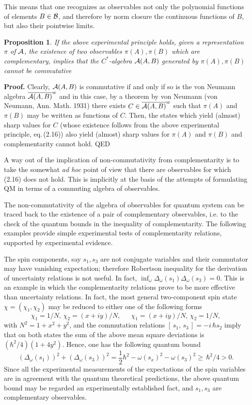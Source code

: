 \documentclass[12pt]{article}
\newtheorem{Proposition}[Theorem]{Proposition}
\def \Pf {{\bf Proof.\,\,}}
\def \ume {{\scriptstyle{\frac{1}{2}}}}
\def \om {{\omega}}
\def \A {{\cal A}}
\def \B {{\cal B}}
\begin{document}
This means that one recognizes as observables not only the polynomial functions of elements $ B \in \B$, and therefore by norm closure the continuous functions of $B$, but also their pointwise limits. 
 \begin{Proposition} If the above experimental principle holds, given a representation $\pi$ of $\A$, the existence of  two  observables $\pi(A), \pi(B)$ which are complementary, implies that  the $C^*$-algebra $\A(A,B)$ generated by $\pi(A), \pi(B)$  cannot be commutative
\end{Proposition}
\Pf Clearly, $\A(A,B)$ is commutative if and only if so is the  von Neumann algebra $\overline{\A(A,B)}^w$ and in this case, by   a theorem by von Neumann (von Neumann, Ann. Math.  1931) there exists $C \in \overline{\A(A,B)}^w$ such that $\pi(A)$ and $\pi(B)$ may be written as functions of $C$. Then, the states which  yield (almost) sharp values   for $C$ (whose existence  follows from the above experimental principle, eq.\,(2.16)) also yield (almost) sharp values for $\pi(A)$ and $\pi(B)$ and complementarity cannot hold. QED

A way out of the implication of non-commutativity from complementarity is to take the somewhat {\em ad hoc } point of view that  there are observables for which (2.16) does not hold. This is implicitly at the basis of the attempts of  formulating QM in terms of a commuting algebra of observables. 

The non-commutativity of the algebra of observables for quantum system can be traced back to the existence of a pair of complementary observables, i.e. to the check of the quantum bounds in the inequality of complementarity. 
The following examples provide simple  experimental tests of complementarity relations, supported by experimental evidence.\goodbreak

\vspace{2mm}
{} 
 
The spin components, say $s_1, s_3$  are not conjugate variables and their commutator may have vanishing expectation; therefore Robertson inequality for the derivation of uncertainty relations is not useful. In fact, $\inf_\om \Delta_\om(s_1) \Delta_\om(s_3) = 0$. This is an example in which the complementarity relations  prove to be  more effective than uncertainty relations. 
In fact, the most general two-component spin state $\chi = (\chi_1, \chi_2)$ may be reduced to either one of the following forms $$\chi_1 = 1/N, \,\chi_2 = (x + i y)/N, \,\,\,\,\,\,\,\,\,\chi_1 = (x + i y)/N, \, \chi_2 = 1/N,$$ with $ N^2 = 1 + x^2 + y^2$, and the commutation relations $[\,s_1,\, s_3 \,] = - i\,\hbar s_2$  imply that  on both states the  sum of the above mean square deviations   is $(\hbar^2/4)( 1 + 4 y^2 )$.   
Hence, one has the following  quantum bound  
$$  (\Delta_\om(s_1))^2 + (\Delta_\om(s_3))^2 = \ume  \hbar^2 - \omega(s_x)^2 - \om(s_3)^2 \geq \,\hbar^2/4 > 0.$$  
Since all the experimental measurements of the expectations of the spin variables are in agreement with the quantum theoretical predictions, the above quantum bound  may be regarded an experimentally established fact, and $s_1, s_3$ are complementary observables.
\end{document}

